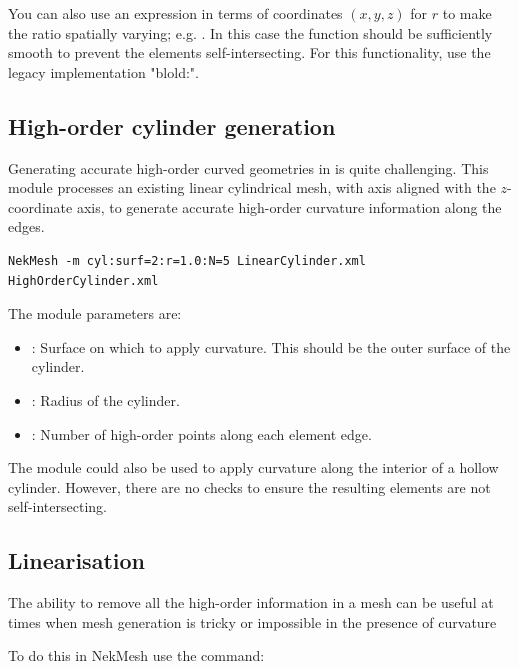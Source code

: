 \begin{notebox}
  You can also use an expression in terms of coordinates $(x,y,z)$ for $r$ to
  make the ratio spatially varying; e.g. . In this case the
  function should be sufficiently smooth to prevent the elements
  self-intersecting. For this functionality, use the legacy 
  implementation "blold:".
\end{notebox}

\subsection{High-order cylinder generation}

Generating accurate high-order curved geometries in \gmsh is quite challenging.
This module processes an existing linear cylindrical mesh, with axis aligned
with the $z$-coordinate axis, to generate accurate high-order curvature
information along the edges.

\begin{lstlisting}[style=BashInputStyle]
NekMesh -m cyl:surf=2:r=1.0:N=5 LinearCylinder.xml HighOrderCylinder.xml
\end{lstlisting}

The module parameters are:

\begin{itemize}
  \item {}: Surface on which to apply curvature. This should be the
  outer surface of the cylinder.
  \item {}: Radius of the cylinder.
  \item {}: Number of high-order points along each element edge.
\end{itemize}

\begin{notebox}
  The module could also be used to apply curvature along the interior of a
  hollow cylinder. However, there are no checks to ensure the resulting elements
  are not self-intersecting.
\end{notebox}

\subsection{Linearisation}

The ability to remove all the high-order information in a mesh can be useful at
times when mesh generation is tricky or impossible in the presence of curvature

To do this in NekMesh use the command:

